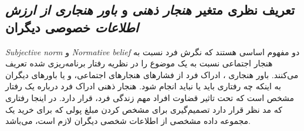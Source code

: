 \subsection{تعریف نظری متغیر
    \textit{هنجار ذهنی }
    و
    \textit{باور هنجاری از ارزش اطلاعات}
    خصوصی دیگران}
    \textit{
        \gls{Subjective norm}
    }
    و
    \textit{
        \gls{Normative belief}
    }
    دو مفهوم اساسی هستند که نگرش فرد نسبت به هنجار اجتماعی نسبت به یک موضوع را در 
    نظریه رفتار برنامه‌ریزی شده
    تعریف می‌کنند. 
    باور هنجاری
    ، ادراک فرد از فشار‌های هنجارهای اجتماعی،  و یا باورهای دیگران 
    به اینکه چه رفتاری باید یا نباید انجام شود. 
    هنجار ذهنی
    ادراک فرد درباره یک رفتار مشخص است که تحت تاثیر قضاوت افراد مهم زندگی 
فرد، قرار دارد. 
در اینجا رفتاری که مد نظر قرار دارد تصمیم‌گیری برای مشخص کردن مبلغ پولی که برای خرید  یک مجموعه داده مشخصی از اطلاعات 
شخصی دیگران لازم است، می‌باشد.
    \!\citep{amjadIdentifyingChangingNormative2009}

